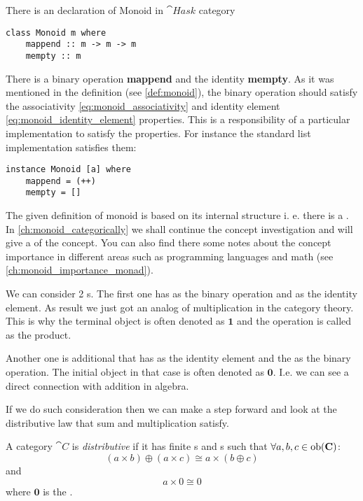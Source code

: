 \begin{example}
There is an declaration of Monoid in $\cat{Hask}$ category
\begin{verbatim}
class Monoid m where
    mappend :: m -> m -> m
    mempty :: m
\end{verbatim}
There is a binary operation \textbf{mappend} and the identity
\textbf{mempty}. As it was mentioned in the 
definition (see \cref{def:monoid}), the binary operation should
satisfy the associativity \eqref{eq:monoid_associativity} and identity
element \eqref{eq:monoid_identity_element} properties. This is a
responsibility of a particular implementation to satisfy the
properties. For instance the standard list implementation satisfies
them:
\begin{verbatim}
instance Monoid [a] where
    mappend = (++)
    mempty = []
\end{verbatim}
\end{example}


\begin{remark}[Monoid]
The given definition of monoid is based on its internal structure i.
e. there is a . In
\cref{ch:monoid_categorically}  we shall continue the 
 concept investigation and will give a
 of the concept. You can also find
there 
some notes about the concept importance in different areas
such as programming languages and math (see
\cref{ch:monoid_importance_monad}).
\end{remark}

We can consider 2 s. The first one has
 as the binary operation and
 as the identity element. As result we
just got an analog of multiplication in the category theory. This is why
the terminal object is often denoted as $\mathbf{1}$ and the operation
is called as the product. 

Another one is additional  that has
 as the identity element and the
 as the binary operation. The initial object in
that case  is often denoted as $\mathbf{0}$. I.e. we can see a direct
connection with addition in algebra.

If we do such consideration then we can make a step forward and look
at the distributive law that sum and multiplication satisfy.
\begin{definition}
\label{def:distributive_category}
A category $\cat{C}$ is \textit{distributive} if 
\cite{wiki:distributive_category}
it has finite
s and s such that 
$\forall a,b,c \in \mathrm{ob}(\mathbf{C})$:
\[
(a \times b) \oplus (a \times c) \cong a \times ( b \oplus c )
\]
and 
\[
a \times 0 \cong 0
\]
where $\mathbf{0}$ is the .
\end{definition} 

